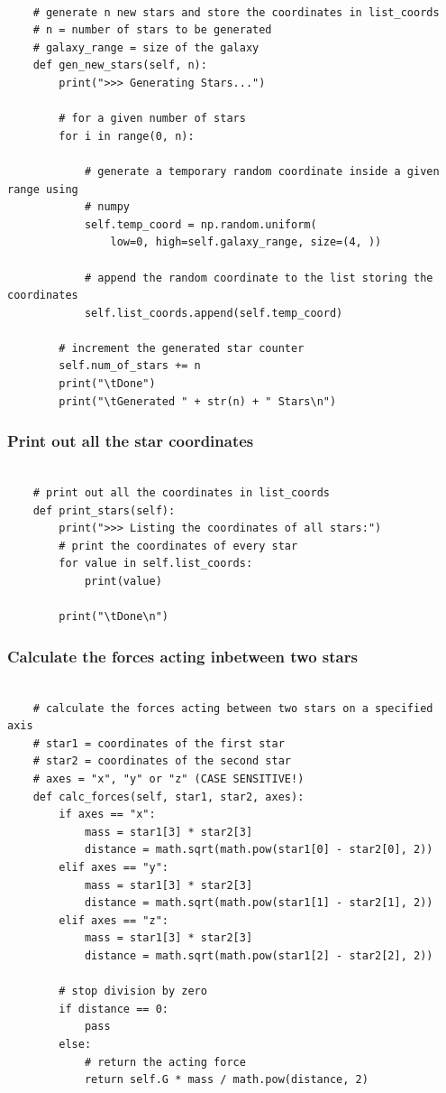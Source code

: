 \begin{lstlisting}

    # generate n new stars and store the coordinates in list_coords
    # n = number of stars to be generated
    # galaxy_range = size of the galaxy
    def gen_new_stars(self, n):
        print(">>> Generating Stars...")

        # for a given number of stars
        for i in range(0, n):

            # generate a temporary random coordinate inside a given range using
            # numpy
            self.temp_coord = np.random.uniform(
                low=0, high=self.galaxy_range, size=(4, ))

            # append the random coordinate to the list storing the coordinates
            self.list_coords.append(self.temp_coord)

        # increment the generated star counter
        self.num_of_stars += n
        print("\tDone")
        print("\tGenerated " + str(n) + " Stars\n")

\end{lstlisting}

\subsubsection{Print out all the star coordinates}

\begin{lstlisting}

    # print out all the coordinates in list_coords
    def print_stars(self):
        print(">>> Listing the coordinates of all stars:")
        # print the coordinates of every star
        for value in self.list_coords:
            print(value)

        print("\tDone\n")

\end{lstlisting}

\subsubsection{Calculate the forces acting inbetween two stars}

\begin{lstlisting}

    # calculate the forces acting between two stars on a specified axis
    # star1 = coordinates of the first star
    # star2 = coordinates of the second star
    # axes = "x", "y" or "z" (CASE SENSITIVE!)
    def calc_forces(self, star1, star2, axes):
        if axes == "x":
            mass = star1[3] * star2[3]
            distance = math.sqrt(math.pow(star1[0] - star2[0], 2))
        elif axes == "y":
            mass = star1[3] * star2[3]
            distance = math.sqrt(math.pow(star1[1] - star2[1], 2))
        elif axes == "z":
            mass = star1[3] * star2[3]
            distance = math.sqrt(math.pow(star1[2] - star2[2], 2))

        # stop division by zero
        if distance == 0:
            pass
        else:
            # return the acting force
            return self.G * mass / math.pow(distance, 2)

\end{lstlisting}

